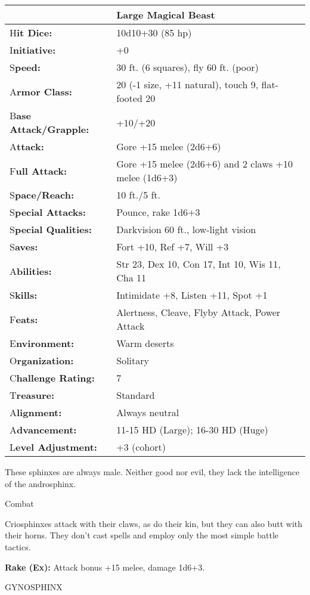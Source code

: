 \documentclass{article}
\begin{document}
\begin{tabular}{|>{\raggedright}p{91pt}|>{\raggedright}p{227pt}|}
\hline
  & Large Magical Beast\tabularnewline
\hline
H\textbf{it Dice:} & 10d10+30 (85 hp)\tabularnewline
\hline
I\textbf{nitiative:} & +0\tabularnewline
\hline
S\textbf{peed:} & 30 ft. (6 squares), fly 60 ft. (poor)\tabularnewline
\hline
A\textbf{rmor Class:} & 20 (-1 size, +11 natural), touch 9, flat-footed 20\tabularnewline
\hline
B\textbf{ase Attack/Grapple:} & +10/+20\tabularnewline
\hline
A\textbf{ttack:} & Gore +15 melee (2d6+6)\tabularnewline
\hline
F\textbf{ull Attack:} & Gore +15 melee (2d6+6) and 2 claws +10 melee (1d6+3)\tabularnewline
\hline
S\textbf{pace/Reach:} & 10 ft./5 ft.\tabularnewline
\hline
S\textbf{pecial Attacks:} & Pounce, rake 1d6+3\tabularnewline
\hline
S\textbf{pecial Qualities:} & Darkvision 60 ft., low-light vision\tabularnewline
\hline
S\textbf{aves:} & Fort +10, Ref +7, Will +3\tabularnewline
\hline
A\textbf{bilities:} & Str 23, Dex 10, Con 17, Int 10, Wis 11, Cha 11\tabularnewline
\hline
S\textbf{kills:} & Intimidate +8, Listen +11, Spot +1\tabularnewline
\hline
F\textbf{eats:} & Alertness, Cleave, Flyby Attack, Power Attack\tabularnewline
\hline
E\textbf{nvironment:} & Warm deserts\tabularnewline
\hline
O\textbf{rganization:} & Solitary\tabularnewline
\hline
C\textbf{hallenge Rating:} & 7\tabularnewline
\hline
T\textbf{reasure:} & Standard\tabularnewline
\hline
A\textbf{lignment:} & Always neutral\tabularnewline
\hline
A\textbf{dvancement:} & 11-15 HD (Large); 16-30 HD (Huge)\tabularnewline
\hline
L\textbf{evel Adjustment:} & +3 (cohort)\tabularnewline
\hline
\end{tabular}

These sphinxes are always male. Neither good nor evil, they lack the intelligence 
of the androsphinx.

Combat

Criosphinxes attack with their claws, as do their kin, but they can also butt with 
their horns. They don't cast spells and employ only the most simple battle tactics.

\textbf{Rake (Ex):} Attack bonus +15 melee, damage 1d6+3.

\vspace{12pt}
GYNOSPHINX
\end{document}
